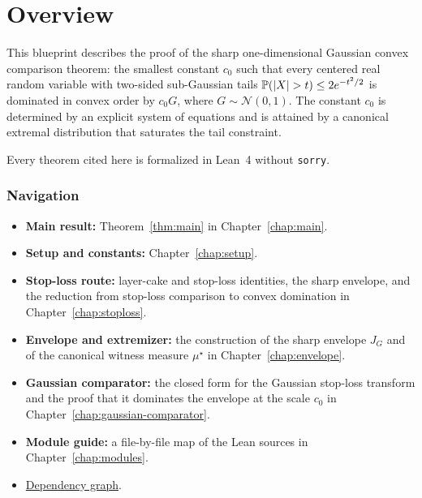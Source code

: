 \chapter{Overview}\label{chap:overview}

This blueprint describes the proof of the sharp one-dimensional
Gaussian convex comparison theorem: the smallest constant $c_0$ such that
every centered real random variable with two-sided sub-Gaussian tails
$\Prb(|X|>t)\le 2e^{-t^2/2}$ is dominated in convex order by $c_0 G$,
where $G\sim\mathcal N(0,1)$.
The constant $c_0$ is determined by an explicit system of equations
and is attained by a canonical extremal distribution that saturates the
tail constraint.

Every theorem cited here is formalized in Lean~4 without \texttt{sorry}.

\subsection*{Navigation}

\begin{itemize}
\item \textbf{Main result:}
  Theorem~\ref{thm:main} in Chapter~\ref{chap:main}.
\item \textbf{Setup and constants:}
  Chapter~\ref{chap:setup}.
\item \textbf{Stop-loss route:}
  layer-cake and stop-loss identities, the sharp envelope, and the reduction from
  stop-loss comparison to convex domination in
  Chapter~\ref{chap:stoploss}.
\item \textbf{Envelope and extremizer:}
  the construction of the sharp envelope $J_G$ and of the canonical witness
  measure $\mu^\star$ in Chapter~\ref{chap:envelope}.
\item \textbf{Gaussian comparator:}
  the closed form for the Gaussian stop-loss transform and the proof that it
  dominates the envelope at the scale $c_0$ in
  Chapter~\ref{chap:gaussian-comparator}.
\item \textbf{Module guide:}
  a file-by-file map of the Lean sources in
  Chapter~\ref{chap:modules}.
\item \hyperref[dep_graph]{Dependency graph}.
\end{itemize}
